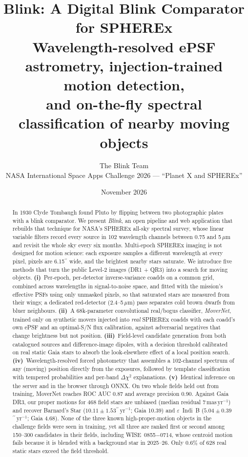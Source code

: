 \documentclass[10pt,twocolumn]{article}
\title{\textbf{Blink: A Digital Blink Comparator for SPHEREx}\\[2pt]
\large Wavelength-resolved ePSF astrometry, injection-trained motion detection,\\
and on-the-fly spectral classification of nearby moving objects}
\author{The Blink Team\\
\small NASA International Space Apps Challenge 2026 --- ``Planet X and SPHEREx''}
\date{November 2026}
\newcommand{\asec}{\ensuremath{^{\prime\prime}}}
\newcommand{\asecyr}{\ensuremath{^{\prime\prime}\,\mathrm{yr}^{-1}}}
\newcommand{\masyr}{\ensuremath{\mathrm{mas\,yr}^{-1}}}
\newcommand{\um}{\ensuremath{\mu\mathrm{m}}}
\newcommand{\SN}{S/N}
\newcommand{\epsIndiB}{$\varepsilon$~Indi~B}
\newcommand{\wise}{WISE~0855$-$0714}
\begin{document}
\maketitle

\begin{abstract}
In 1930 Clyde Tombaugh found Pluto by flipping between two photographic plates with a blink comparator.
We present \emph{Blink}, an open pipeline and web application that rebuilds that technique for NASA's
SPHEREx all-sky spectral survey, whose linear variable filters record every source in 102 wavelength
channels between 0.75 and 5\,\um{} and revisit the whole sky every six months.
Multi-epoch SPHEREx imaging is not designed for motion science: each exposure samples a different
wavelength at every pixel, pixels are 6.15\asec{} wide, and the brightest nearby stars saturate.
We introduce five methods that turn the public Level-2 images (DR1 + QR3) into a search for moving objects.
\textbf{(i)}~Per-epoch, per-detector inverse-variance coadds on a common grid, combined across wavelengths
in signal-to-noise space, and fitted with the mission's effective PSFs using only unmasked pixels, so that
saturated stars are measured from their wings; a dedicated red-detector (2.4--5\,\um) pass separates cold
brown dwarfs from bluer neighbours.
\textbf{(ii)}~A 68k-parameter convolutional real/bogus classifier, \emph{MoverNet}, trained only on
synthetic movers injected into \emph{real} SPHEREx coadds with each coadd's own ePSF and an optimal-\SN{}
flux calibration, against adversarial negatives that change brightness but not position.
\textbf{(iii)}~Field-level candidate generation from both catalogued sources and difference-image dipoles,
with a decision threshold calibrated on real static Gaia stars to absorb the look-elsewhere effect of a
local position search.
\textbf{(iv)}~Wavelength-resolved forced photometry that assembles a 102-channel spectrum of any (moving)
position directly from the exposures, followed by template classification with tempered probabilities and
per-band $\Delta\chi^2$ explanations.
\textbf{(v)}~Identical inference on the server and in the browser through ONNX.
On two whole fields held out from training, MoverNet reaches ROC AUC 0.87 and average precision 0.90.
Against Gaia DR3, our proper motions for 468 field stars are unbiased (median residual 7\,\masyr) and
recover Barnard's Star ($10.11\pm1.53$\asecyr; Gaia 10.39) and \epsIndiB{} ($5.04\pm0.39$\asecyr; Gaia 4.68).
None of the three known high-proper-motion objects in the challenge fields were seen in training, yet all
three are ranked first or second among 150--300 candidates in their fields, including \wise{}, whose
centroid motion fails because it is blended with a background star in 2025--26.
Only 0.6\% of 628 real static stars exceed the field threshold.
\end{abstract}
\end{document}
